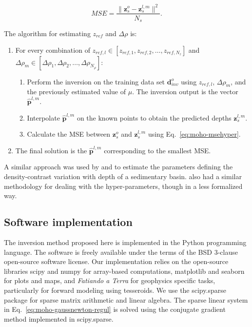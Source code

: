 \begin{equation}
    MSE = \dfrac{\|\mathbf{z}^o_s - \mathbf{z}^{l,m}_{s}\|^2}{N_s}.
    \label{eq:moho-msehyper}
\end{equation}

The algorithm for estimating $z_{ref}$ and $\Delta\rho$ is:

\begin{enumerate}
    \item For every combination of
        $z_{ref,l} \in [z_{ref,1},z_{ref,2},\ldots,z_{ref,N_z}]$ and
        $\Delta\rho_m \in
         [\Delta\rho_1,\Delta\rho_2,\ldots,\Delta\rho_{N_{\rho}}]$:
    \begin{enumerate}
        \item Perform the inversion on the training data set
            $\mathbf{d}^o_{inv}$ using $z_{ref,l}$, $\Delta\rho_m$, and
            the previously estimated value of $\mu$.
            The inversion output is the vector $\mathbf{\hat{p}}^{l,m}$.
        \item Interpolate $\mathbf{\hat{p}}^{l,m}$
            on the known points to obtain the predicted depths
            $\mathbf{z}_s^{l,m}$.
        \item Calculate the MSE between $\mathbf{z}_s^o$ and
            $\mathbf{z}_s^{l,m}$ using Eq.~\ref{eq:moho-msehyper}.
    \end{enumerate}
    \item The final solution is the $\mathbf{\hat{p}}^{l,m}$ corresponding to
        the smallest MSE.
\end{enumerate}

A similar approach was used by \citet{silva2006} and \citet{martins2010}
to estimate the parameters defining
the density-contrast variation with depth
of a sedimentary basin.
\citet{vandermeijde2013} also had
a similar methodology for dealing with the hyper-parameters,
though in a less formalized way.



\subsection{Software implementation}\label{sec:software}

The inversion method proposed here is implemented in the Python programming
language.
The software is freely available
under the terms of the BSD 3-clause open-source software license.
Our implementation relies on the open-source libraries
scipy and numpy \citep[][ \url{http://scipy.org}]{jones2001}
for array-based computations,
matplotlib \citep[][ \url{http://matplotlib.org}]{hunter2007}
and seaborn
\citep[][ \url{http://stanford.edu/~mwaskom/software/seaborn}]{waskom2015}
for plots and maps,
and \textit{Fatiando a Terra} \citep[][ \url{http://www.fatiando.org}]{uieda2013a}
for geophysics specific tasks,
particularly for forward modeling using tesseroids.
We use the scipy.sparse package for sparse matrix arithmetic and linear
algebra.
The sparse linear system in Eq.~\ref{eq:moho-gaussnewton-regul}
is solved using the conjugate gradient method implemented in scipy.sparse.


